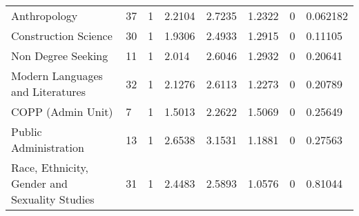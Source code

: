 \begin{sidewaystable}
{\begin{longtable}{llllllll}
	Anthropology & 37 & 1 & 2.2104 & 2.7235 & 1.2322 & 0 & 0.062182 \\ 
	Construction Science & 30 & 1 & 1.9306 & 2.4933 & 1.2915 & 0 & 0.11105 \\ 
	Non Degree Seeking & 11 & 1 & 2.014 & 2.6046 & 1.2932 & 0 & 0.20641 \\ 
	Modern Languages and Literatures & 32 & 1 & 2.1276 & 2.6113 & 1.2273 & 0 & 0.20789 \\ 
	COPP  (Admin Unit) & 7 & 1 & 1.5013 & 2.2622 & 1.5069 & 0 & 0.25649 \\ 
	Public Administration & 13 & 1 & 2.6538 & 3.1531 & 1.1881 & 0 & 0.27563 \\ 
	Race, Ethnicity, Gender and Sexuality Studies & 31 & 1 & 2.4483 & 2.5893 & 1.0576 & 0 & 0.81044 \\ 
	\hline 
	\end{longtable}}
\end{sidewaystable}


\newpage

